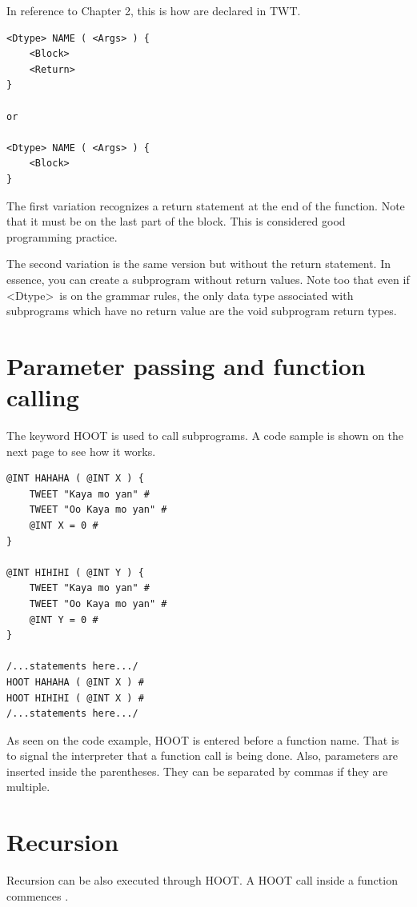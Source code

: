 \documentclass[11pt,a4paper]{report}
\begin{document}
In reference to Chapter 2, this is how  are declared in TWT.

\begin{lstlisting}
<Dtype> NAME ( <Args> ) {
	<Block>
	<Return>
}

or

<Dtype> NAME ( <Args> ) {
	<Block>
}
\end{lstlisting}

The first variation recognizes a return statement at the end of the function.
Note that it must be on the last part of the block. This is considered good
programming practice.\par

The second variation is the same version but without the return statement. In
essence, you can create a subprogram without return values. Note too that even
if \textless Dtype\textgreater\ is on the grammar rules, the only data type
associated with subprograms which have no return value are the void subprogram return types.

\section{Parameter passing and function calling}

The keyword HOOT is used to call subprograms. A code sample is shown on the next
page to see how it works.

\begin{lstlisting}
@INT HAHAHA ( @INT X ) {
    TWEET "Kaya mo yan" #
    TWEET "Oo Kaya mo yan" #
    @INT X = 0 #
}

@INT HIHIHI ( @INT Y ) {
    TWEET "Kaya mo yan" #
    TWEET "Oo Kaya mo yan" #
    @INT Y = 0 #
}

/...statements here.../
HOOT HAHAHA ( @INT X ) #
HOOT HIHIHI ( @INT X ) #
/...statements here.../
\end{lstlisting}

As seen on the code example, HOOT is entered before a function name. That is to
signal the interpreter that a function call is being done. Also, parameters are
inserted inside the parentheses. They can be separated by commas if they are
multiple.

\section{Recursion}

Recursion can be also executed through HOOT. A HOOT call inside a function
commences .

\printindex
\end{document}
